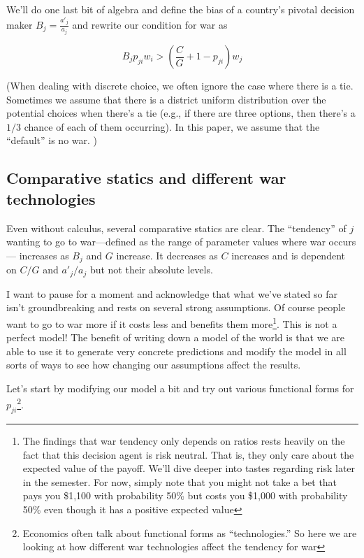 We'll do one last bit of algebra and define the bias of a country's pivotal decision maker $B_j = \frac{a'_j}{a_j}$ and rewrite our condition for war as

\begin{equation}\label{warOg}
    B_{j} p_{ji}w_i> \left(\frac{C}{G} + 1-p_{ji}\right)w_j
\end{equation}

(When dealing with discrete choice, we often ignore the case where there is a tie. Sometimes we assume that there is a district uniform distribution over the potential choices when there's a tie (e.g., if there are three options, then there's a $1/3$ chance of each of them occurring). In this paper, we assume that the ``default'' is no war. )

\subsection*{Comparative statics and different war technologies}

Even without calculus, several comparative statics are clear. The ``tendency'' of $j$ wanting to go to war---defined as the range of parameter values where war occurs--- increases as $B_j$ and $G$ increase. It decreases as $C$ increases and is dependent on $C/G$ and $a'_j/a_j$ but not their absolute levels. 

I want to pause for a moment and acknowledge that what we've stated so far isn't groundbreaking and rests on several strong assumptions. Of course people want to go to war more if it costs less and benefits them more\footnote{The findings that war tendency only depends on ratios rests heavily on the fact that this decision agent is risk neutral. That is, they only care about the expected value of the payoff. We'll dive deeper into tastes regarding risk later in the semester. For now, simply note that you might not take a bet that pays you \$1,100 with probability 50\% but costs you \$1,000 with probability 50\% even though it has a positive expected value}. This is not a perfect model! The benefit of writing down a model of the world is that we are able to use it to generate very concrete predictions and modify the model in all sorts of ways to see how changing our assumptions affect the results.


Let's start by modifying our model a bit and try out various functional forms for $p_{ji}$\footnote{Economics often talk about functional forms as ``technologies.'' So here we are looking at how different war technologies affect the tendency for war}. 

